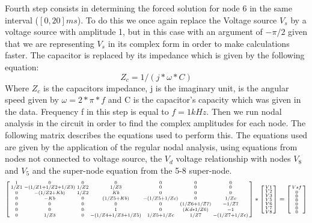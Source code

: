 Fourth step consists in determining the forced solution for node 6 in the same interval ($[0, 20]ms$). To do this we once again replace the Voltage source $V_s$ by a voltage source with amplitude 1, but in this case with an argument of $-\pi/2$ given that we are representing $V_s$ in its complex form in order to make calculations faster. The capacitor is replaced by its impedance which is given by the following equation:
\begin{equation}
Z_c=1/(j*\omega*C)
\end{equation}
Where $Z_c$ is the capacitors impedance, j is the imaginary unit, \omega is the angular speed given by $\omega=2*\pi*f$ and C is the capacitor's capacity which was given in the data. Frequency f in this step is equal to $f=1kHz$.
Then we run nodal analysis in the circuit in order to find the complex amplitudes for each node. The following matrix describes the equations used to perform this. The equations used are given by the application of the regular nodal analysis, using equations from nodes not connected to voltage source, the $V_d$ voltage relationship with nodes $V_8$ and $V_5$ and the super-node equation from the 5-8 super-node.
\begin{equation}
\begin{bsmallmatrix}
1 & 0 & 0 & 0 & 0 & 0 & 0\\
1/Z1 & -(1/Z1 + 1/Z2 + 1/Z3) & 1/Z2 & 1/Z3 & 0 & 0 & 0\\
0 & -(1/Z2 + Kb) & 1/Z2 & Kb & 0 & 0 & 0\\
0 & -Kb & 0 & (1/Z5 + Kb) & -(1/Z5+1/Zc) & 0 & 1/Zc\\
0 & 0 & 0 & 0 & 0 & (1/Z6 + 1/Z7) & -1/Z7\\
0 & 0 & 0 & 1 & 0 & (Kd * 1/Z6) & -1\\
0 & 1/Z3 & 0 & -(1/Z4 + 1/Z3 + 1/Z5) & 1/Z5+1/Zc & 1/Z7 & -(1/Z7+1/Zc)\\
\end{bsmallmatrix}
*
\begin{bsmallmatrix}
V1\\V2\\V3\\V5\\V6\\V7\\V8
\end{bsmallmatrix}
=
\begin{bsmallmatrix}
Vsf\\0\\0\\0\\0\\0\\0
\end{bsmallmatrix}
\end{equation}
